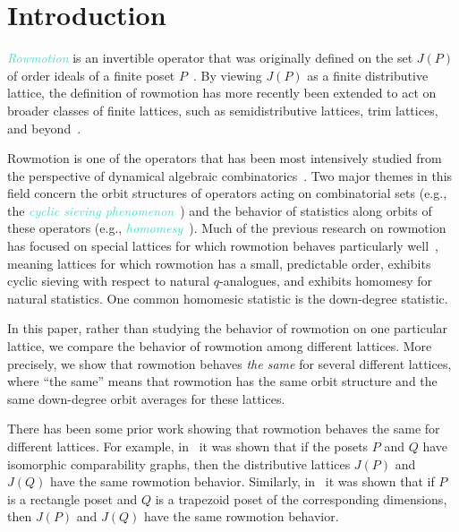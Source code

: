 \documentclass[11pt]{amsart}
\newcommand{\dfn}[1]{\textcolor{Turquoise}{\emph{#1}}}
\theoremstyle{definition}
\begin{document}
\section{Introduction} \label{sec:intro}

\dfn{Rowmotion} is an invertible operator that was originally defined on the set $J(P)$ of order ideals of a finite poset $P$~\cite{brouwer1974period, cameron1995orbits, panyushev2009orbits, striker2012rowmotion}. By viewing $J(P)$ as a finite distributive lattice, the definition of rowmotion has more recently been extended to act on broader classes of finite lattices, such as semidistributive lattices, trim lattices, and beyond~\cite{barnard2019canonical, thomas2019rowmotion, thomas2019independence, defant2023semidistrim, defant2025echelonmotion}.

Rowmotion is one of the operators that has been most intensively studied from the perspective of dynamical algebraic combinatorics~\cite{roby2016dac, striker2017dac}. Two major themes in this field concern the orbit structures of operators acting on combinatorial sets (e.g., the \dfn{cyclic sieving phenomenon}~\cite{reiner2004cyclic, sagan2011cyclic}) and the behavior of statistics along orbits of these operators (e.g., \dfn{homomesy}~\cite{propp2015homomesy}). Much of the previous research on rowmotion has focused on special lattices for which rowmotion behaves particularly well~\cite{panyushev2009orbits,armstrong2013uniform, rush2013orbits}, meaning lattices for which rowmotion has a small, predictable order, exhibits cyclic sieving with respect to natural $q$-analogues, and exhibits homomesy for natural statistics. One common homomesic statistic is the down-degree statistic.

In this paper, rather than studying the behavior of rowmotion on one particular lattice, we compare the behavior of rowmotion among different lattices. More precisely, we show that rowmotion behaves \emph{the same} for several different lattices, where ``the same'' means that rowmotion has the same orbit structure and the same down-degree orbit averages for these lattices.
  
There has been some prior work showing that rowmotion behaves the same for different lattices. For example, in~\cite[Proposition~4.10]{hopkins2022minuscule} it was shown that if the posets $P$ and $Q$ have isomorphic comparability graphs, then the distributive lattices $J(P)$ and $J(Q)$ have the same rowmotion behavior. Similarly, in~\cite{dao2022rowmotion} it was shown that if $P$ is a rectangle poset and $Q$ is a trapezoid poset of the corresponding dimensions, then $J(P)$ and $J(Q)$ have the same rowmotion behavior.
\end{document}
